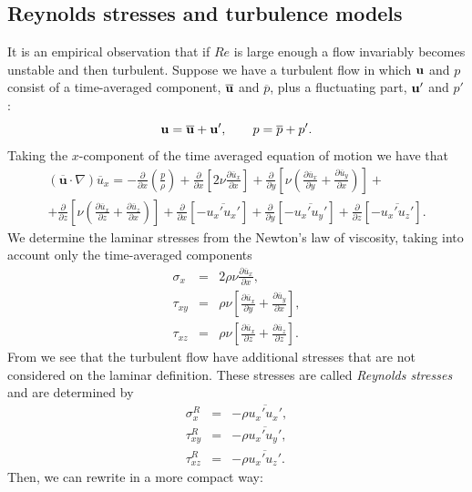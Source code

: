 \subsection{Reynolds stresses and turbulence models}
It is an empirical observation that if $Re$ is large enough a flow invariably becomes unstable and then turbulent. Suppose we have a turbulent flow in which ${\bf u}$ and $p$ consist of a time-averaged component, $\overline{{\bf u}}$ and $\overline{p}$, plus a fluctuating part, ${\bf u}'$ and $p'$:
$${\bf u}=\overline{{\bf u}}+{\bf u}',\qquad p=\overline{p}+p'.$$
Taking the $x$-component of the time averaged equation of motion we have that
\begin{eqnarray}
\label{eq-momentum_x}
(\overline{\mathbf{u}}\cdot\nabla)\overline{u}_x=-\frac{\partial}{\partial x}\left(\frac{p}{\rho}\right)+\frac{\partial}{\partial x}\left[2\nu\frac{\partial \overline{u}_x}{\partial x}\right]+\frac{\partial}{\partial y}\left[\nu\left(\frac{\partial \overline{u}_x}{\partial y}+\frac{\partial \overline{u}_y}{\partial x}\right)\right]+\\ \nonumber
+\frac{\partial}{\partial z}\left[\nu\left(\frac{\partial \overline{u}_x}{\partial z}+\frac{\partial \overline{u}_z}{\partial x}\right)\right]+\frac{\partial}{\partial x}[-\overline{u_x'u_x'}]+\frac{\partial}{\partial y}[-\overline{u_x'u_y'}]+\frac{\partial}{\partial z}[-\overline{u_x'u_z'}].
\end{eqnarray}
We determine the laminar stresses from the Newton's law of viscosity, taking into account only the time-averaged components
\begin{eqnarray*}
\sigma_x&=&2\rho\nu\frac{\partial \overline{u}_x}{\partial x},\\
\tau_{xy}&=&\rho\nu\left[\frac{\partial \overline{u}_x}{\partial y}+\frac{\partial \overline{u}_y}{\partial x}\right],\\
\tau_{xz}&=&\rho\nu\left[\frac{\partial \overline{u}_x}{\partial z}+\frac{\partial \overline{u}_z}{\partial z}\right].
\end{eqnarray*}
From  we see that the turbulent flow have additional stresses that are not considered on the laminar definition. These stresses are called \textit{Reynolds stresses} and are determined by
\begin{eqnarray*}
\sigma_x^R&=&-\rho\overline{u_x'u_x'},\\
\tau_{xy}^R&=&-\rho\overline{u_x'u_y'},\\
\tau_{xz}^R&=&-\rho\overline{u_x'u_z'}.
\end{eqnarray*}
Then, we can rewrite  in a more compact way:
